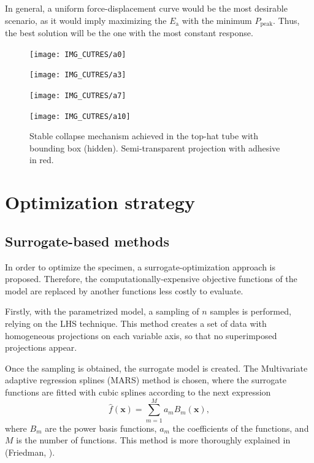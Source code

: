\documentclass[cmfonts]{witpress}
\begin{document}
In general, a uniform force-displacement curve would be the most desirable scenario, as it would imply maximizing the $E_\text{a}$  with the minimum $P_\text{peak}$. Thus, the best solution will be the one with the most constant response.

\begin{figure}[htpb]
	\centering
	\begin{minipage}[b]{.15\linewidth}
		\centering
		\texttt{[image: IMG\_CUTRES/a0]}
	\end{minipage}
	\hfill
	\begin{minipage}[b]{.15\linewidth}
		\centering
		\texttt{[image: IMG\_CUTRES/a3]}
	\end{minipage}
	\hfill
	\begin{minipage}[b]{.15\linewidth}
		\centering
		\texttt{[image: IMG\_CUTRES/a7]}
	\end{minipage}
	\hfill
	\begin{minipage}[b]{.15\linewidth}
		\centering
		\texttt{[image: IMG\_CUTRES/a10]}
	\end{minipage}
	\caption[Stable collapse mechanism achieved in the top-hat tube with bounding box.]{Stable collapse mechanism achieved in the top-hat tube with bounding box (hidden). Semi-transparent projection with adhesive in red.}
	\label{fig:stable}
\end{figure}


\section{Optimization strategy}

\subsection{Surrogate-based methods}

In order to optimize the specimen, a surrogate-optimization approach is proposed. Therefore, the computationally-expensive  objective functions of the model are replaced by another functions less costly to evaluate. 

Firstly, with the parametrized model, a sampling of $n$ samples is performed, relying on the LHS technique. This method creates a set of data with homogeneous projections on each variable axis, so that no superimposed projections appear. 

Once the sampling is obtained, the surrogate model is created. The Multivariate adaptive regression splines (MARS) method is chosen, where the surrogate functions are fitted with cubic splines according to the next expression
\begin{equation}\label{eq:mars}
\hat{f}\left ( \bm{x} \right )= \sum_{m=1}^{M}a_{m}B_{m}\left ( \bm{x} \right ),
\end{equation}
where $B_{m}$ are the power basis functions, $a_{m}$ the coefficients of the functions, and $M$ is the number of functions. This method is more thoroughly explained in (Friedman, \cite{Friedman1995197}). 
\end{document}
